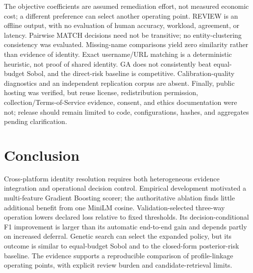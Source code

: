 \documentclass[conference]{IEEEtran}
\begin{document}
The objective coefficients are assumed remediation effort, not measured economic cost; a different preference can select another operating point. REVIEW is an offline output, with no evaluation of human accuracy, workload, agreement, or latency. Pairwise MATCH decisions need not be transitive; no entity-clustering consistency was evaluated. Missing-name comparisons yield zero similarity rather than evidence of identity. Exact username/URL matching is a deterministic heuristic, not proof of shared identity. GA does not consistently beat equal-budget Sobol, and the direct-risk baseline is competitive. Calibration-quality diagnostics and an independent replication corpus are absent. Finally, public hosting was verified, but reuse license, redistribution permission, collection/Terms-of-Service evidence, consent, and ethics documentation were not; release should remain limited to code, configurations, hashes, and aggregates pending clarification.

\section{Conclusion}
Cross-platform identity resolution requires both heterogeneous evidence integration and operational decision control. Empirical development motivated a multi-feature Gradient Boosting scorer; the authoritative ablation finds little additional benefit from one MiniLM cosine. Validation-selected three-way operation lowers declared loss relative to fixed thresholds. Its decision-conditional F1 improvement is larger than its automatic end-to-end gain and depends partly on increased deferral. Genetic search can select the expanded policy, but its outcome is similar to equal-budget Sobol and to the closed-form posterior-risk baseline. The evidence supports a reproducible comparison of profile-linkage operating points, with explicit review burden and candidate-retrieval limits.



\end{document}
